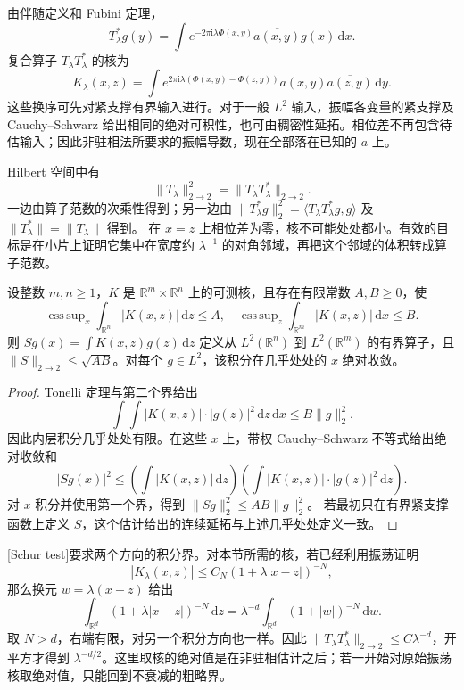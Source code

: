 由伴随定义和 Fubini 定理，
\[
 T_\lambda^*g(y)=\int e^{-2\pi\mathrm i\lambda\Phi(x,y)}
                         \overline{a(x,y)}g(x)\,\mathrm dx.
\]
复合算子 \(T_\lambda T_\lambda^*\) 的核为
\[
 K_\lambda(x,z)=\int
 e^{2\pi\mathrm i\lambda(\Phi(x,y)-\Phi(z,y))}
 a(x,y)\overline{a(z,y)}\,\mathrm dy.
\]
这些换序可先对紧支撑有界输入进行。对于一般 \(L^2\) 输入，振幅各变量的紧支撑及 Cauchy--Schwarz 给出相同的绝对可积性，也可由稠密性延拓。相位差不再包含待估输入；因此非驻相法所要求的振幅导数，现在全部落在已知的 \(a\) 上。

\ProseParagraphBreak
Hilbert 空间中有
\[
 \|T_\lambda\|_{2\to2}^2
 =\|T_\lambda T_\lambda^*\|_{2\to2}.
\]
一边由算子范数的次乘性得到；另一边由
\(\|T_\lambda^*g\|_2^2
 =\langle T_\lambda T_\lambda^*g,g\rangle\)
及 \(\|T_\lambda^*\|=\|T_\lambda\|\) 得到。
在 \(x=z\) 上相位差为零，核不可能处处都小。有效的目标是在小片上证明它集中在宽度约 \(\lambda^{-1}\) 的对角邻域，再把这个邻域的体积转成算子范数。

\begin{lemma}[Schur 检验]\label{b2:lem:21-schur}
设整数 \(m,n\ge1\)，\(K\) 是 \(\mathbb R^m\times\mathbb R^n\) 上的可测核，且存在有限常数 \(A,B\ge0\)，使
\[
 \mathop{\mathrm{ess\,sup}}_x\int_{\mathbb R^n}|K(x,z)|\,\mathrm dz\le A,
 \quad
 \mathop{\mathrm{ess\,sup}}_z\int_{\mathbb R^m}|K(x,z)|\,\mathrm dx\le B.
\]
则 \(Sg(x)=\int K(x,z)g(z)\,\mathrm dz\) 定义从 \(L^2(\mathbb R^n)\) 到 \(L^2(\mathbb R^m)\) 的有界算子，且
\(\|S\|_{2\to2}\le\sqrt{AB}\)。对每个 \(g\in L^2\)，该积分在几乎处处的 \(x\) 绝对收敛。
\end{lemma}
\begin{proof}
Tonelli 定理与第二个界给出
\[
 \int\!\int |K(x,z)|\cdot|g(z)|^2\,\mathrm dz\,\mathrm dx
 \le B\|g\|_2^2.
\]
因此内层积分几乎处处有限。在这些 \(x\) 上，带权 Cauchy--Schwarz 不等式给出绝对收敛和
\[
 |Sg(x)|^2
 \le\left(\int |K(x,z)|\,\mathrm dz\right)
       \left(\int |K(x,z)|\cdot|g(z)|^2\,\mathrm dz\right).
\]
对 \(x\) 积分并使用第一个界，得到
\(\|Sg\|_2^2\le AB\|g\|_2^2\)。
若最初只在有界紧支撑函数上定义 \(S\)，这个估计给出的连续延拓与上述几乎处处定义一致。
\end{proof}

[Schur test]要求两个方向的积分界。对本节所需的核，若已经利用振荡证明
\[
 |K_\lambda(x,z)|\le C_N(1+\lambda|x-z|)^{-N},
\]
那么换元 \(w=\lambda(x-z)\) 给出
\[
 \int_{\mathbb R^d}(1+\lambda|x-z|)^{-N}\,\mathrm dz
 =\lambda^{-d}\int_{\mathbb R^d}(1+|w|)^{-N}\,\mathrm dw.
\]
取 \(N>d\)，右端有限，对另一个积分方向也一样。因此
\(\|T_\lambda T_\lambda^*\|_{2\to2}\le C\lambda^{-d}\)，开平方才得到 \(\lambda^{-d/2}\)。这里取核的绝对值是在非驻相估计之后；若一开始对原始振荡核取绝对值，只能回到不衰减的粗略界。

